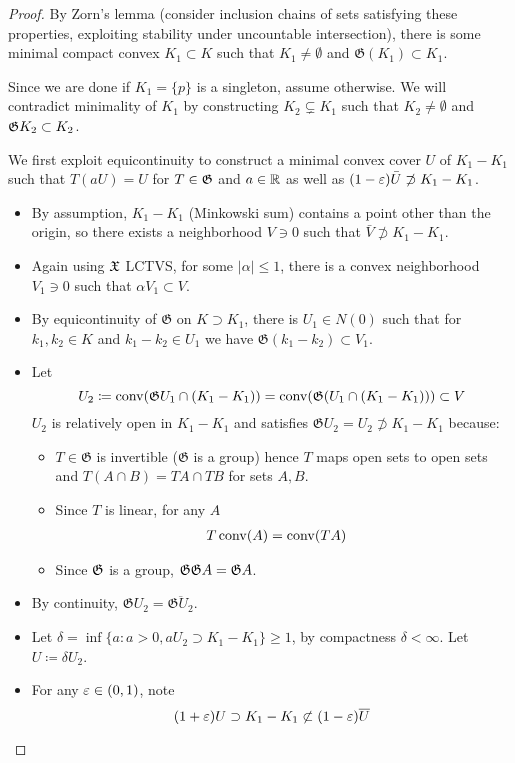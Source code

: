 \begin{proof}
  By Zorn's lemma (consider inclusion chains of sets satisfying these
  properties, exploiting stability under uncountable intersection),
  there is some minimal compact convex $K_1 \subset K$ such that $K_1 \neq
  \emptyset$ and $\mathfrak{G}(K_1) \subset K_1$.

  Since we are done if $K_1 = \{p\}$ is a singleton, assume otherwise.
  We will contradict minimality of $K_1$ by constructing $K_2 \subsetneq K_1$
  such that $K_2 \neq \emptyset$ and $\mathfrak{G} K_2 \subset K_2$.

  We first exploit equicontinuity to construct
  a minimal convex cover $U$ of $K_1 - K_1$
  such that $T(a U) = U$ for $T \in \mathfrak{G}$ and $a \in \mathbb{R}$
  as well as $(1 - \varepsilon) \bar{U} \not\supset K_1 - K_1$.
  \begin{itemize}
    \item
      By assumption, $K_1 - K_1$ (Minkowski sum) contains a point other than
      the origin, so there exists a neighborhood $V \ni 0$ such that
      $\bar{V} \not\supset K_1 - K_1$.
    \item Again using $\mathfrak{X}$ LCTVS, for some $\lvert \alpha \rvert \leq 1$,
      there is a convex neighborhood $V_1 \ni 0$ such that $\alpha V_1
      \subset V$.
    \item By equicontinuity of $\mathfrak{G}$ on $K \supset K_1$, there is
      $U_1 \in N(0)$ such that for $k_1, k_2 \in K$ and
      $k_1 - k_2 \in U_1$ we have $\mathfrak{G}(k_1 - k_2) \subset V_1$.
    \item Let
      \[
        U_2
        \coloneqq \operatorname{conv}(\mathfrak{G} U_1 \cap (K_1 - K_1)) \\
        = \operatorname{conv}(\mathfrak{G}(U_1 \cap (K_1 - K_1))) \subset V
      \]
      $U_2$
      is relatively open in $K_1 - K_1$ and satisfies
      $\mathfrak{G} U_2 = U_2 \not\supset K_1 - K_1$
      because:
      \begin{itemize}
        \item $T \in \mathfrak{G}$ is invertible ($\mathfrak{G}$ is a group)
          hence $T$ maps open sets to open sets and $T(A \cap
          B) = TA \cap TB$ for sets $A, B$.
        \item Since $T$ is linear, for any $A$
          \begin{align}
            T \operatorname{conv}(A) &= \operatorname{conv}(TA)
          \end{align}
        \item Since $\mathfrak{G}$ is a group, $\mathfrak{G} \mathfrak{G} A = \mathfrak{G} A$.
      \end{itemize}
    \item By continuity, $\mathfrak{G} U_2 = \overline{\mathfrak{G} U_2}$.
    \item Let $\delta = \inf \{ a : a > 0, a U_2 \supset K_1 - K_1 \} \geq 1$,
      by compactness $\delta < \infty$. Let $U \coloneqq \delta U_2$.
    \item For any $\varepsilon \in (0,1)$, note
      \[
        (1+\varepsilon) U \supset K_1 - K_1 \not\subset (1-\varepsilon) \overline{U}
      \]
  \end{itemize}


\end{proof}

